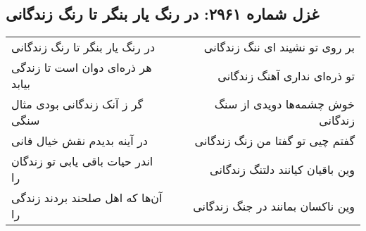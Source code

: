 \begin{center}
\section*{غزل شماره ۲۹۶۱: در رنگ یار بنگر تا رنگ زندگانی}
\label{sec:2961}
\begin{longtable}{l p{0.5cm} r}
در رنگ یار بنگر تا رنگ زندگانی
&&
بر روی تو نشیند ای ننگ زندگانی
\\
هر ذره‌ای دوان است تا زندگی بیابد
&&
تو ذره‌ای نداری آهنگ زندگانی
\\
گر ز آنک زندگانی بودی مثال سنگی
&&
خوش چشمه‌ها دویدی از سنگ زندگانی
\\
در آینه بدیدم نقش خیال فانی
&&
گفتم چیی تو گفتا من زنگ زندگانی
\\
اندر حیات باقی یابی تو زندگان را
&&
وین باقیان کیانند دلتنگ زندگانی
\\
آن‌ها که اهل صلحند بردند زندگی را
&&
وین ناکسان بمانند در جنگ زندگانی
\\
\end{longtable}
\end{center}
